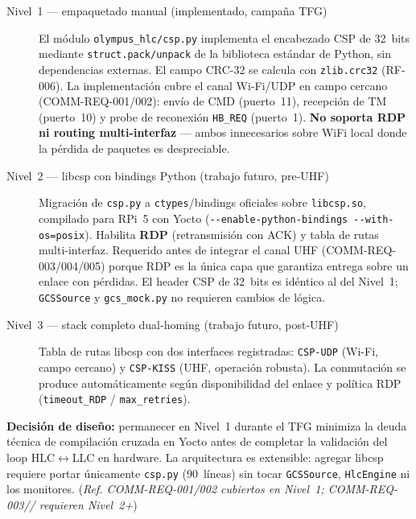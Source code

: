\begin{sloppypar}
\begin{description}
  \item[Nivel~1 — empaquetado manual (implementado, campaña TFG)]
    El módulo \texttt{olympus\_hlc/\allowbreak csp.py} implementa el encabezado CSP de 32~bits
    mediante \texttt{struct.pack/\allowbreak unpack} de la biblioteca estándar de Python, sin
    dependencias externas. El campo CRC-32 se calcula con \texttt{zlib.crc32}
    (RF-006). La implementación cubre el canal Wi-Fi/UDP en campo cercano
    (COMM-REQ-001/002): envío de CMD (puerto~11), recepción de TM (puerto~10)
    y probe de reconexión \texttt{HB\_\allowbreak REQ} (puerto~1). \textbf{No soporta RDP ni
    routing multi-interfaz} — ambos innecesarios sobre WiFi local donde la
    pérdida de paquetes es despreciable.

  \item[Nivel~2 — libcsp con bindings Python (trabajo futuro, pre-UHF)]
    Migración de \texttt{csp.py} a \texttt{ctypes}/bindings oficiales sobre
    \texttt{libcsp.so}, compilado para RPi~5 con Yocto
    (\texttt{-{}-enable-python-\allowbreak bindings -\allowbreak-with-os=posix}).
    Habilita \textbf{RDP} (retransmisión con ACK) y tabla de rutas multi-interfaz.
    Requerido antes de integrar el canal UHF (COMM-REQ-003/004/005) porque RDP
    es la única capa que garantiza entrega sobre un enlace con pérdidas.
    El header CSP de 32~bits es idéntico al del Nivel~1;
    \texttt{GCSSource} y \texttt{gcs\_mock.py} no requieren cambios de lógica.

  \item[Nivel~3 — stack completo dual-homing (trabajo futuro, post-UHF)]
    Tabla de rutas libcsp con dos interfaces registradas:
    \texttt{CSP-UDP} (Wi-Fi, campo cercano) y
    \texttt{CSP-KISS} (UHF, operación robusta).
    La conmutación se produce automáticamente según disponibilidad del enlace
    y política RDP (\texttt{timeout\_\allowbreak RDP} / \texttt{max\_\allowbreak retries}).
\end{description}
\end{sloppypar}

\begin{sloppypar}
\textbf{Decisión de diseño:} permanecer en Nivel~1 durante el TFG minimiza
la deuda técnica de compilación cruzada en Yocto antes de completar la
validación del loop HLC$\leftrightarrow$LLC en hardware. La arquitectura es
extensible: agregar libcsp requiere portar únicamente \texttt{csp.py}
(90~líneas) sin tocar \texttt{GCSSource}, \texttt{HlcEngine} ni los monitores.
(\emph{Ref. COMM-REQ-001/002 cubiertos en Nivel~1; COMM-REQ-003// requieren Nivel~2+})
\end{sloppypar}

